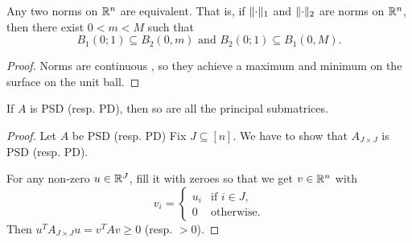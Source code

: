 \begin{lemma}
    Any two norms on $\mathbb{R}^n$ are equivalent.
    That is, if $\lVert\cdot\rVert_1$ and $\lVert\cdot\rVert_2$ are norms on
    $\mathbb{R}^n$, then there exist $0 < m < M$ such that \[
        B_1(0; 1) \subseteq B_2(0, m) \text{ and }
        B_2(0; 1) \subseteq B_1(0, M).
    \]
\end{lemma}
\begin{proof}
    Norms are continuous ,
    so they achieve a maximum and minimum on the surface on the unit ball.
\end{proof}

\begin{lemma} \label{thm:sylv-forward}
    If $A$ is PSD (resp.{} PD), then so are all the principal submatrices.
\end{lemma}
\begin{proof}
    Let $A$ be PSD (resp.{} PD)
    Fix $J \subseteq [n]$.
    We have to show that $A_{J \times J}$ is PSD (resp.{} PD).

    For any non-zero $u \in \mathbb{R}^J$, fill it with zeroes so that we get
    $v \in \mathbb{R}^n$ with \[
        v_i = \begin{cases}
            u_i & \text{if } i \in J, \\
            0 & \text{otherwise}.
        \end{cases}
    \] Then $u^T A_{J \times J} u = v^T A v \ge 0$ (resp.{} $> 0$).
\end{proof}

